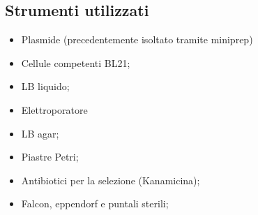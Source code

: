 \documentclass{extarticle}
\begin{document}
\subsection*{Strumenti utilizzati}
\begin{minipage}{0.50\textwidth} 
    \begin{itemize}
        \item Plasmide (precedentemente isoltato tramite miniprep)
        \item Cellule competenti BL21;
        \item LB liquido;
        \item Elettroporatore
    \end{itemize}
\end{minipage} \hfill
\begin{minipage}{0.50\textwidth} 
    \begin{itemize}
        \item LB agar;
        \item Piastre Petri;
        \item Antibiotici per la selezione (Kanamicina);
        \item Falcon, eppendorf e puntali sterili;
    \end{itemize}
\end{minipage}
\end{document}
